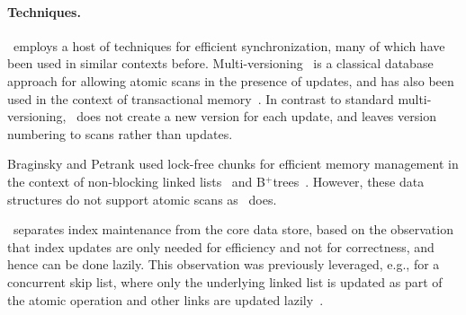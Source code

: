 
\paragraph{Techniques.}
\kiwi\ employs a host of techniques for efficient synchronization, many of which have been used in similar contexts before.
Multi-versioning~\cite{BHG:Book87}
is a classical database approach for allowing atomic scans in the presence of updates,
and has also been used  in the context of transactional memory~\cite{mv-stm-chapter}. 
In contrast to standard multi-versioning, \kiwi\ does not create a new version for each update, 
and leaves version numbering to scans rather than updates.

Braginsky and Petrank used lock-free chunks  for efficient memory management
in the context of non-blocking linked lists~\cite{LinkedListBP} and B$^{+}$trees~\cite{BraginskyP2012}.
However, these data structures do not support atomic scans as \kiwi\ does.

\kiwi\ separates index maintenance from the core data store, based  on the observation that index updates are only needed for efficiency and not for correctness, and hence can be done lazily. This observation was previously leveraged, e.g.,
for a concurrent skip list, where only the underlying linked list is updated as part of the atomic operation and other links are updated lazily~\cite{bpc16,HerlihyLLS2007,HerlihyS2008,Spiegelman:2016}.



